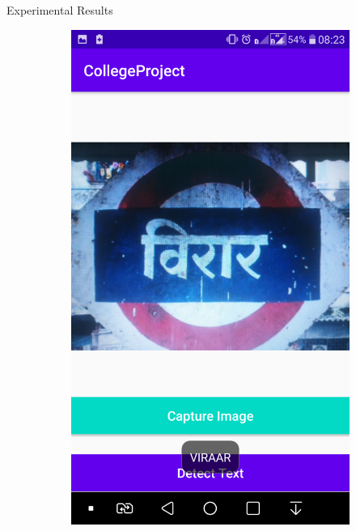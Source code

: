 \documentclass{beamer}
\begin{document}
\begin{frame}[allowframebreaks]{Experimental Results}
\begin{figure}
\begin{subfigure}[b]{0.3\linewidth}
			{\includegraphics[width=\linewidth]{App_FResult_1}}
			\label{App}
	\end{subfigure}
	\begin{subfigure}[b]{0.3\linewidth}

\end{subfigure}
\end{figure}
\end{frame}
\end{document}
